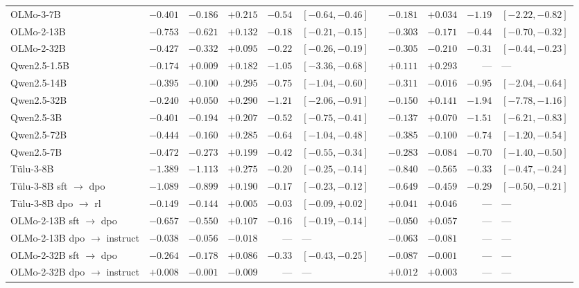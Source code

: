 \begin{table}[tb]
\begin{tabular}{lrrrrlcrrrl}
OLMo-3-7B & $-0.401$ & $-0.186$ & $+0.215$ & $-0.54$ & $[-0.64,-0.46]$ & & $-0.181$ & $+0.034$ & $-1.19$ & $[-2.22,-0.82]$ \\
OLMo-2-13B & $-0.753$ & $-0.621$ & $+0.132$ & $-0.18$ & $[-0.21,-0.15]$ & & $-0.303$ & $-0.171$ & $-0.44$ & $[-0.70,-0.32]$ \\
OLMo-2-32B & $-0.427$ & $-0.332$ & $+0.095$ & $-0.22$ & $[-0.26,-0.19]$ & & $-0.305$ & $-0.210$ & $-0.31$ & $[-0.44,-0.23]$ \\
Qwen2.5-1.5B & $-0.174$ & $+0.009$ & $+0.182$ & $-1.05$ & $[-3.36,-0.68]$ & & $+0.111$ & $+0.293$ & --- & --- \\
Qwen2.5-14B & $-0.395$ & $-0.100$ & $+0.295$ & $-0.75$ & $[-1.04,-0.60]$ & & $-0.311$ & $-0.016$ & $-0.95$ & $[-2.04,-0.64]$ \\
Qwen2.5-32B & $-0.240$ & $+0.050$ & $+0.290$ & $-1.21$ & $[-2.06,-0.91]$ & & $-0.150$ & $+0.141$ & $-1.94$ & $[-7.78,-1.16]$ \\
Qwen2.5-3B & $-0.401$ & $-0.194$ & $+0.207$ & $-0.52$ & $[-0.75,-0.41]$ & & $-0.137$ & $+0.070$ & $-1.51$ & $[-6.21,-0.83]$ \\
Qwen2.5-72B & $-0.444$ & $-0.160$ & $+0.285$ & $-0.64$ & $[-1.04,-0.48]$ & & $-0.385$ & $-0.100$ & $-0.74$ & $[-1.20,-0.54]$ \\
Qwen2.5-7B & $-0.472$ & $-0.273$ & $+0.199$ & $-0.42$ & $[-0.55,-0.34]$ & & $-0.283$ & $-0.084$ & $-0.70$ & $[-1.40,-0.50]$ \\
T\"ulu-3-8B & $-1.389$ & $-1.113$ & $+0.275$ & $-0.20$ & $[-0.25,-0.14]$ & & $-0.840$ & $-0.565$ & $-0.33$ & $[-0.47,-0.24]$ \\
\midrule
T\"ulu-3-8B sft $\to$ dpo & $-1.089$ & $-0.899$ & $+0.190$ & $-0.17$ & $[-0.23,-0.12]$ & & $-0.649$ & $-0.459$ & $-0.29$ & $[-0.50,-0.21]$ \\
T\"ulu-3-8B dpo $\to$ rl & $-0.149$ & $-0.144$ & $+0.005$ & $-0.03$ & $[-0.09,+0.02]$ & & $+0.041$ & $+0.046$ & --- & --- \\
OLMo-2-13B sft $\to$ dpo & $-0.657$ & $-0.550$ & $+0.107$ & $-0.16$ & $[-0.19,-0.14]$ & & $-0.050$ & $+0.057$ & --- & --- \\
OLMo-2-13B dpo $\to$ instruct & $-0.038$ & $-0.056$ & $-0.018$ & --- & --- & & $-0.063$ & $-0.081$ & --- & --- \\
OLMo-2-32B sft $\to$ dpo & $-0.264$ & $-0.178$ & $+0.086$ & $-0.33$ & $[-0.43,-0.25]$ & & $-0.087$ & $-0.001$ & --- & --- \\
OLMo-2-32B dpo $\to$ instruct & $+0.008$ & $-0.001$ & $-0.009$ & --- & --- & & $+0.012$ & $+0.003$ & --- & --- \\
\bottomrule
\end{tabular}
\end{table}
